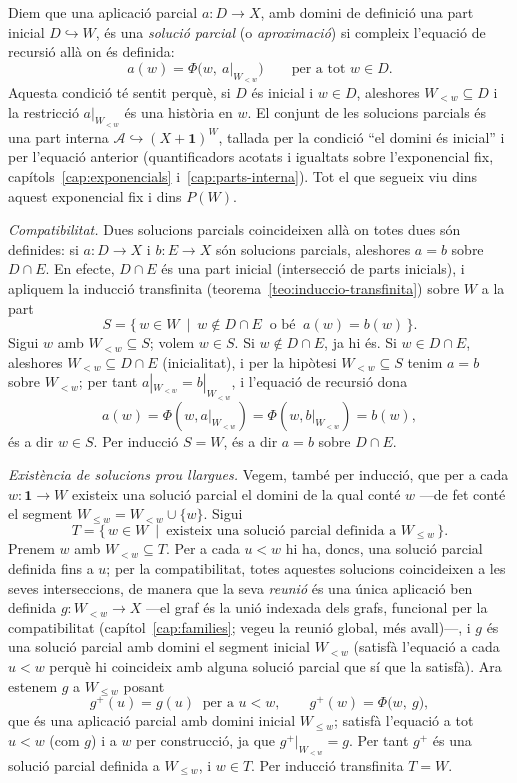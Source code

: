 \begin{prova}
Diem que una aplicació parcial \(a\colon D\to X\), amb domini de definició una
part inicial \(D\hookrightarrow W\), és una \emph{solució parcial} (o
\emph{aproximació}) si compleix l'equació de recursió allà on és definida:
\[
a(w)=\Phi\bigl(w,\ a|_{W_{<w}}\bigr)
\qquad\text{per a tot } w\in D .
\]
Aquesta condició té sentit perquè, si \(D\) és inicial i \(w\in D\), aleshores
\(W_{<w}\subseteq D\) i la restricció \(a|_{W_{<w}}\) és una història en \(w\).
El conjunt de les solucions parcials és una part interna \(\mathcal
A\hookrightarrow(X+\mathbf1)^{W}\), tallada per la condició
\enquote{el domini és inicial} i per l'equació anterior (quantificadors
acotats i igualtats sobre l'exponencial fix,
capítols~\ref{cap:exponencials} i~\ref{cap:parts-interna}). Tot el que segueix
viu dins aquest exponencial fix i dins \(P(W)\).

\emph{Compatibilitat.} Dues solucions parcials coincideixen allà on totes
dues són definides: si \(a\colon D\to X\) i \(b\colon E\to X\) són solucions
parcials, aleshores \(a=b\) sobre \(D\cap E\). En efecte, \(D\cap E\) és una
part inicial (intersecció de parts inicials), i apliquem la inducció
transfinita (teorema~\ref{teo:induccio-transfinita}) sobre \(W\) a la part
\[
S=\{\,w\in W\ \mid\ w\notin D\cap E\ \text{ o bé }\ a(w)=b(w)\,\}.
\]
Sigui \(w\) amb \(W_{<w}\subseteq S\); volem \(w\in S\). Si \(w\notin D\cap
E\), ja hi és. Si \(w\in D\cap E\), aleshores \(W_{<w}\subseteq D\cap E\)
(inicialitat), i per la hipòtesi \(W_{<w}\subseteq S\) tenim \(a=b\) sobre
\(W_{<w}\); per tant \(a|_{W_{<w}}=b|_{W_{<w}}\), i l'equació de recursió dona
\[
a(w)=\Phi(w,a|_{W_{<w}})=\Phi(w,b|_{W_{<w}})=b(w),
\]
és a dir \(w\in S\). Per inducció \(S=W\), és a dir \(a=b\) sobre \(D\cap E\).

\emph{Existència de solucions prou llargues.} Vegem, també per inducció, que
per a cada \(w\colon\mathbf1\to W\) existeix una solució parcial el domini de
la qual conté \(w\) ---de fet conté el segment \(W_{\le w}=W_{<w}\cup\{w\}\).
Sigui
\[
T=\{\,w\in W\ \mid\ \text{existeix una solució parcial definida a } W_{\le w}\,\}.
\]
Prenem \(w\) amb \(W_{<w}\subseteq T\). Per a cada \(u<w\) hi ha, doncs, una
solució parcial definida fins a \(u\); per la compatibilitat, totes aquestes
solucions coincideixen a les seves interseccions, de manera que la seva
\emph{reunió} és una única aplicació ben definida \(g\colon W_{<w}\to X\)
---el graf és la unió indexada dels grafs, funcional per la compatibilitat
(capítol~\ref{cap:families}; vegeu la reunió global, més avall)---, i \(g\) és una solució parcial amb domini el
segment inicial \(W_{<w}\) (satisfà l'equació a cada \(u<w\) perquè hi
coincideix amb alguna solució parcial que sí que la satisfà). Ara estenem
\(g\) a \(W_{\le w}\) posant
\[
g^{+}(u)=g(u)\ \text{ per a } u<w,
\qquad
g^{+}(w)=\Phi\bigl(w,\ g\bigr),
\]
que és una aplicació parcial amb domini inicial \(W_{\le w}\); satisfà
l'equació a tot \(u<w\) (com \(g\)) i a \(w\) per construcció, ja que
\(g^{+}|_{W_{<w}}=g\). Per tant \(g^{+}\) és una solució parcial definida a
\(W_{\le w}\), i \(w\in T\). Per inducció transfinita \(T=W\).


\end{prova}
